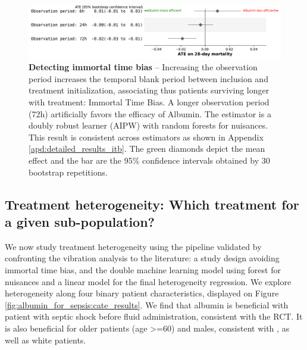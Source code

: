 \documentclass[french,12pt,twoside,a4paper]{book}
\begin{document}
\begin{figure}[h!]
  \centering
  \includegraphics[width=\linewidth]{img/chapter_4/itb__immortal_time_bias_double_robust_forest_agg_first_last__bs_30.pdf}
  \caption{\textbf{Detecting immortal time bias} -- Increasing the observation period increases the temporal blank period
    between inclusion and treatment initialization, associating thus
    patients surviving longer with treatment: Immortal
    Time Bias. A longer observation period (72h) artificially favors the
    efficacy of Albumin. The estimator is a doubly robust learner (AIPW) with random
    forests for nuisances. This result is consistent across estimators as shown
    in Appendix \ref{apd:detailed_results_itb}. The green diamonds depict the
    mean effect and the bar are the 95\% confidence intervals obtained by 30
    bootstrap repetitions. }\label{fig:albumin_for_sepsis:immortal_time_bias}
\end{figure}


\subsection{Treatment heterogeneity: Which treatment for a given
  sub-population?}%
\label{subsec:causal_tuto:heterogeneity_mimic}%


We now study treatment heterogeneity using the pipeline validated by confronting
the vibration analysis to the literature: a study design avoiding immortal time
bias, and the double machine learning model using forest for nuisances and a
linear model for the final heterogeneity regression. We explore heterogeneity
along four binary patient characteristics, displayed on Figure
\ref{fig:albumin_for_sepsis:cate_results}. We find that albumin is beneficial
with patient with septic shock before fluid administration, consistent with the
\cite{caironi2014albumin} RCT. It is also beneficial for older patients (age
>=60) and males, consistent with \citep{zhou2021early}, as well as white patients.
\end{document}
